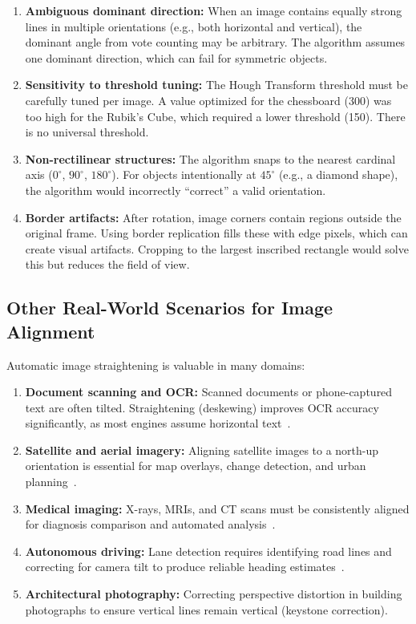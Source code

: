 \documentclass[12pt]{article}
\begin{document}
\begin{enumerate}
    \item \textbf{Ambiguous dominant direction:} When an image contains equally strong lines in multiple orientations (e.g., both horizontal and vertical), the dominant angle from vote counting may be arbitrary. The algorithm assumes one dominant direction, which can fail for symmetric objects.

    \item \textbf{Sensitivity to threshold tuning:} The Hough Transform threshold must be carefully tuned per image. A value optimized for the chessboard (300) was too high for the Rubik's Cube, which required a lower threshold (150). There is no universal threshold.

    \item \textbf{Non-rectilinear structures:} The algorithm snaps to the nearest cardinal axis ($0^\circ$, $90^\circ$, $180^\circ$). For objects intentionally at $45^\circ$ (e.g., a diamond shape), the algorithm would incorrectly ``correct'' a valid orientation.

    \item \textbf{Border artifacts:} After rotation, image corners contain regions outside the original frame. Using border replication fills these with edge pixels, which can create visual artifacts. Cropping to the largest inscribed rectangle would solve this but reduces the field of view.
\end{enumerate}

\subsection{Other Real-World Scenarios for Image Alignment}
Automatic image straightening is valuable in many domains:

\begin{enumerate}
    \item \textbf{Document scanning and OCR:} Scanned documents or phone-captured text are often tilted. Straightening (deskewing) improves OCR accuracy significantly, as most engines assume horizontal text~\cite{das2001deskewing}.

    \item \textbf{Satellite and aerial imagery:} Aligning satellite images to a north-up orientation is essential for map overlays, change detection, and urban planning~\cite{opencv_docs}.

    \item \textbf{Medical imaging:} X-rays, MRIs, and CT scans must be consistently aligned for diagnosis comparison and automated analysis~\cite{oliveira2014medical}.

    \item \textbf{Autonomous driving:} Lane detection requires identifying road lines and correcting for camera tilt to produce reliable heading estimates~\cite{hillel2014lanes}.

    \item \textbf{Architectural photography:} Correcting perspective distortion in building photographs to ensure vertical lines remain vertical (keystone correction).
\end{enumerate}
\end{document}
